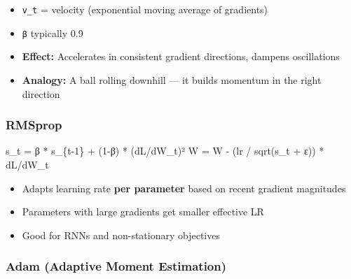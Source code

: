 \documentclass[11pt]{article}
\providecommand{\tightlist}{\setlength{\itemsep}{1pt}\setlength{\parskip}{0pt}}
\newenvironment{Shaded}{\begin{snugshade}}{\end{snugshade}}
\newcommand{\DecValTok}[1]{\textcolor[rgb]{0.96,0.45,0.00}{#1}}
\newcommand{\NormalTok}[1]{\textcolor[rgb]{0.81,0.81,0.76}{#1}}
\newcommand{\OperatorTok}[1]{\textcolor[rgb]{0.81,0.81,0.76}{#1}}
\begin{document}
\begin{itemize}
\tightlist
\item
  \texttt{v\_t} = velocity (exponential moving average of gradients)
\item
  \texttt{β} typically 0.9
\item
  \textbf{Effect:} Accelerates in consistent gradient directions, dampens oscillations
\item
  \textbf{Analogy:} A ball rolling downhill --- it builds momentum in the right direction
\end{itemize}

\subsubsection{RMSprop}\label{rmsprop}


\begin{Shaded}
\begin{Highlighting}[]
\NormalTok{s\_t }\OperatorTok{=}\NormalTok{ β }\OperatorTok{*}\NormalTok{ s\_\{t}\OperatorTok{{-}}\DecValTok{1}\NormalTok{\} }\OperatorTok{+}\NormalTok{ (}\DecValTok{1}\OperatorTok{{-}}\NormalTok{β) }\OperatorTok{*}\NormalTok{ (dL}\OperatorTok{/}\NormalTok{dW\_t)²}
\NormalTok{W }\OperatorTok{=}\NormalTok{ W }\OperatorTok{{-}}\NormalTok{ (lr }\OperatorTok{/}\NormalTok{ sqrt(s\_t }\OperatorTok{+}\NormalTok{ ε)) }\OperatorTok{*}\NormalTok{ dL}\OperatorTok{/}\NormalTok{dW\_t}
\end{Highlighting}
\end{Shaded}

\begin{itemize}
\tightlist
\item
  Adapts learning rate \textbf{per parameter} based on recent gradient magnitudes
\item
  Parameters with large gradients get smaller effective LR
\item
  Good for RNNs and non-stationary objectives
\end{itemize}

\subsubsection{Adam (Adaptive Moment Estimation)}\label{adam-adaptive-moment-estimation}

\end{document}
